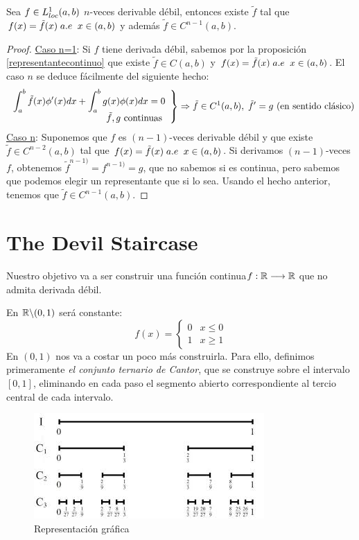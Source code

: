 \begin{prop}
\label{derivadanesima}
Sea $f\in L^1_{loc}(a,b)$ $n$-veces derivable débil, entonces existe $\tilde{f}$ tal que $f(x)=\tilde{f}(x) \; a.e \;\; x\in(a,b)$ y además $\tilde{f}\in C^{n-1}(a,b)$.
\end{prop}

\begin{proof}
\underline{Caso n=1}: Si $f$ tiene derivada débil, sabemos por la proposición \ref{representantecontinuo} que existe $\tilde{f}\in C(a,b)$ y $f(x)=\tilde{f}(x) \;a.e \;\; x\in(a,b)$.
El caso $n$ se deduce fácilmente del siguiente hecho:
\[
\left.
\begin{array}{r}
\displaystyle\int_{ a }^{ b } \tilde{f}(x)\phi'(x)dx+\displaystyle\int_{ a }^{ b } g(x)\phi(x)dx=0 \\
\tilde{f}, g \text{ continuas }
\end{array}
\right\} \Rightarrow \tilde{f}\in C^1(a,b), \;\tilde{f}'=g \text{ (en sentido clásico)}
\]
\underline{Caso n}: Suponemos que $f$ es $(n-1)$-veces derivable débil y que existe $\tilde{f}\in C^{n-2}(a,b)$ tal que $f(x)=\tilde{f}(x)\;a.e \;\; x\in(a,b)$.
Si derivamos $(n-1)$-veces $f$, obtenemos $\tilde{f}^{n-1)}=f^{n-1)}=g$, que no sabemos si es continua, pero sabemos que podemos elegir un representante que si lo sea. Usando el hecho anterior, tenemos que $\tilde{f}\in C^{n-1}(a,b)$.
\end{proof}

\section{The Devil Staircase}

Nuestro objetivo va a ser construir una función continua$f : \mathbb{R} \longrightarrow \mathbb{R}$ que no admita derivada débil.

En $\mathbb{R}\backslash(0,1)$ será constante:
\[
f(x)=\left\{
\begin{array}{cc}
0 & x\leq 0\\
1 & x\geq 1
\end{array}
\right.
\]
En $(0,1)$ nos va a costar un poco más construirla. Para ello, definimos primeramente \textit{el conjunto ternario de Cantor}, que se construye sobre el intervalo $[0,1]$, eliminando en cada paso el segmento abierto correspondiente al tercio central de cada intervalo.

\begin{figure}[h]
   \center
  \includegraphics[scale=0.5]{img/cantor.jpeg}
  \caption{Representación gráfica}
\end{figure}

